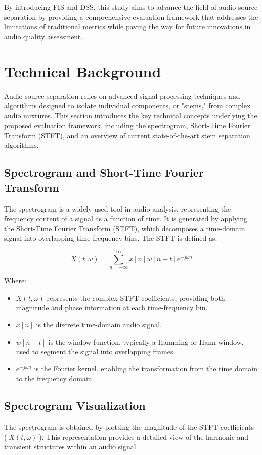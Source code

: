 \documentclass[10pt,twocolumn]{article}
\begin{document}
By introducing FIS and DSS, this study aims to advance the field of audio source separation by providing a comprehensive evaluation framework that addresses the limitations of traditional metrics while paving the way for future innovations in audio quality assessment.

\section{Technical Background}

Audio source separation relies on advanced signal processing techniques and algorithms designed to isolate individual components, or "stems," from complex audio mixtures. This section introduces the key technical concepts underlying the proposed evaluation framework, including the spectrogram, Short-Time Fourier Transform (STFT), and an overview of current state-of-the-art stem separation algorithms.

\subsection{Spectrogram and Short-Time Fourier Transform}

The spectrogram is a widely used tool in audio analysis, representing the frequency content of a signal as a function of time. It is generated by applying the Short-Time Fourier Transform (STFT), which decomposes a time-domain signal into overlapping time-frequency bins. The STFT is defined as:

\[
X(t, \omega) = \sum_{n=-\infty}^{\infty} x[n] w[n-t] e^{-j \omega n}
\]

Where:
\begin{itemize}
    \item \(X(t, \omega)\) represents the complex STFT coefficients, providing both magnitude and phase information at each time-frequency bin.
    \item \(x[n]\) is the discrete time-domain audio signal.
    \item \(w[n-t]\) is the window function, typically a Hamming or Hann window, used to segment the signal into overlapping frames.
    \item \(e^{-j \omega n}\) is the Fourier kernel, enabling the transformation from the time domain to the frequency domain.
\end{itemize}


\subsection{Spectrogram Visualization}
The spectrogram is obtained by plotting the magnitude of the STFT coefficients (\(|X(t, \omega)|\)). This representation provides a detailed view of the harmonic and transient structures within an audio signal.
\end{document}
